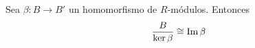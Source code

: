 %
%
%
\begin{teorema}
	 \label{teo:first-iso} Sea \(\beta : B \to B'\) un homomorfismo
	de \(R\)-módulos. Entonces
	\[
		\frac{B}{\ker \beta}\cong \operatorname{Im} \beta
	\]
\end{teorema}
